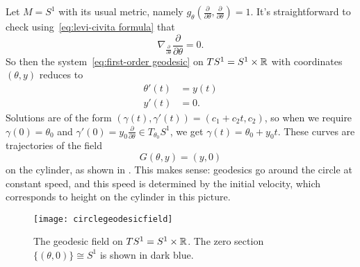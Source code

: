 \begin{example}
	Let $M = S^1$ with its usual metric, namely $g_\theta \left( \frac{\partial}{\partial \theta},\frac{\partial}{\partial \theta}\right) = 1$. It's straightforward to check using~\eqref{eq:levi-civita formula} that 
	\[
		\nabla_{\frac{\partial}{\partial \theta}}\frac{\partial}{\partial \theta} = 0.
	\]
	So then the system~\eqref{eq:first-order geodesic} on $TS^1 = S^1 \times \mathbb{R}$ with coordinates $(\theta, y)$ reduces to
	\begin{align*}
		\theta'(t) & = y(t) \\
		y'(t) & = 0.
	\end{align*}
	Solutions are of the form $(\gamma(t),\gamma'(t)) = (c_1 + c_2 t,c_2)$, so when we require $\gamma(0) = \theta_0$ and $\gamma'(0) = y_0 \frac{\partial}{\partial \theta} \in T_{\theta_0}S^1$, we get $\gamma(t) = \theta_0 + y_0 t$. These curves are trajectories of the field
	\[
		G(\theta,y) = (y,0)
	\]
	on the cylinder, as shown in . This makes sense: geodesics go around the circle at constant speed, and this speed is determined by the initial velocity, which corresponds to height on the cylinder in this picture.
	\begin{figure}[htbp]
		\centering
			\texttt{[image: circlegeodesicfield]}
		\caption{The geodesic field on $TS^1 = S^1 \times \mathbb{R}$. The zero section $\{(\theta,0)\} \cong S^1$ is shown in dark blue.}
		\label{fig:circle geodesic field}
	\end{figure}
\end{example}

